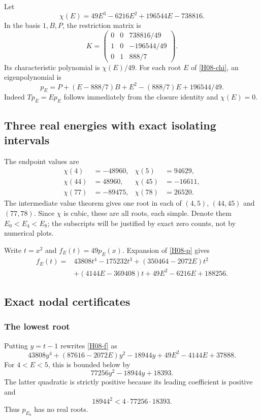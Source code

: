 \documentclass[11pt,a4paper]{article}
\theoremstyle{definition}\newtheorem{definition}[theorem]{Definition}
\theoremstyle{remark}\newtheorem{remark}[theorem]{Remark}
\numberwithin{equation}{section}
\begin{document}
Let
\begin{equation}\label{H08-chi}
\chi(E)=49E^3-6216E^2+196544E-738816.
\end{equation}
In the basis $1,B,P$, the restriction matrix is\[K=\begin{pmatrix}0&0&738816/49\\1&0&-196544/49\\0&1&888/7\end{pmatrix}.\] Its characteristic polynomial is $\chi(E)/49$. For each root $E$ of \eqref{H08-chi}, an eigenpolynomial is
\begin{equation}\label{H08-p}
p_E=P+(E-888/7)B+E^2-(888/7)E+196544/49.
\end{equation}
Indeed $Tp_E=Ep_E$ follows immediately from the closure identity and $\chi(E)=0$.
\subsection{Three real energies with exact isolating intervals}\label{H08-sec-4}
The endpoint values are
\begin{align*}
\chi(4)&=-48960,&\chi(5)&=94629,\\
\chi(44)&=48960,&\chi(45)&=-16611,\\
\chi(77)&=-89475,&\chi(78)&=26520.
\end{align*}
The intermediate value theorem gives one root in each of $(4,5)$, $(44,45)$ and $(77,78)$. Since $\chi$ is cubic, these are all roots, each simple. Denote them $E_0<E_4<E_8$; the subscripts will be justified by exact zero counts, not by numerical plots.

Write $t=x^2$ and $f_E(t)=49p_E(x)$. Expansion of \eqref{H08-p} gives
\begin{align}\label{H08-f}
f_E(t)={}&43808t^4-175232t^3+(350464-2072E)t^2\nonumber\\
&+(4144E-369408)t+49E^2-6216E+188256.
\end{align}
\subsection{Exact nodal certificates}\label{H08-sec-5}
\subsubsection*{The lowest root}
Putting $y=t-1$ rewrites \eqref{H08-f} as
\[43808y^4+(87616-2072E)y^2-18944y+49E^2-4144E+37888.
\]
For $4<E<5$, this is bounded below by
\[77256y^2-18944y+18393.
\]
The latter quadratic is strictly positive because its leading coefficient is positive and
\[18944^2<4\cdot77256\cdot18393.
\]
Thus $p_{E_0}$ has no real roots.
\end{document}
